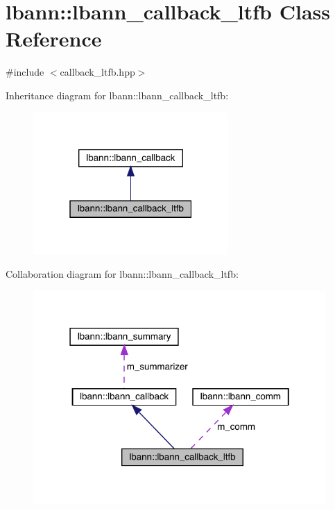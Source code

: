 \hypertarget{classlbann_1_1lbann__callback__ltfb}{}\section{lbann\+:\+:lbann\+\_\+callback\+\_\+ltfb Class Reference}
\label{classlbann_1_1lbann__callback__ltfb}


{\ttfamily \#include $<$callback\+\_\+ltfb.\+hpp$>$}



Inheritance diagram for lbann\+:\+:lbann\+\_\+callback\+\_\+ltfb\+:\nopagebreak
\begin{figure}[H]
\begin{center}
\leavevmode
\includegraphics[width=211pt]{classlbann_1_1lbann__callback__ltfb__inherit__graph}
\end{center}
\end{figure}


Collaboration diagram for lbann\+:\+:lbann\+\_\+callback\+\_\+ltfb\+:\nopagebreak
\begin{figure}[H]
\begin{center}
\leavevmode
\includegraphics[width=316pt]{classlbann_1_1lbann__callback__ltfb__coll__graph}
\end{center}
\end{figure}
